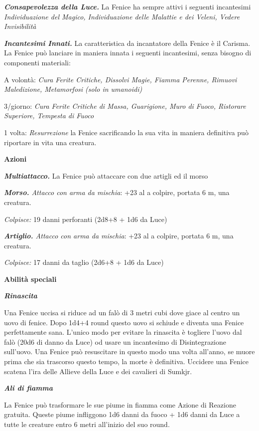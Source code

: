 \begin{multicols}{2}
\textit{\textbf{Consapevolezza della Luce.}} La Fenice ha sempre attivi i seguenti incantesimi \textit{Individuazione del Magico, Individuazione delle Malattie e dei Veleni, Vedere Invisibilità}

\textit{\textbf{Incantesimi Innati.}} La caratteristica da incantatore della Fenice è il Carisma. La Fenice può lanciare in maniera innata i seguenti incantesimi, senza bisogno di componenti materiali:

A volontà: \textit{Cura Ferite Critiche, Dissolvi Magie, Fiamma Perenne, Rimuovi Maledizione, Metamorfosi (solo in umanoidi)}

3/giorno: \textit{Cura Ferite Critiche di Massa, Guarigione, Muro di Fuoco, Ristorare Superiore, Tempesta di Fuoco}

1 volta: \textit{Resurrezione} la Fenice sacrificando la sua vita in maniera definitiva può riportare in vita una creatura.

\textbf{Azioni}

\textit{\textbf{Multiattacco.}} La Fenice può attaccare con due artigli ed il morso

\textit{\textbf{Morso.} Attacco con arma da mischia}: +23 al a colpire, portata 6 m, una creatura.

\textit{Colpisce:} 19 danni perforanti (2d8+8 + 1d6 da Luce)

\textit{\textbf{Artiglio.} Attacco con arma da mischia}: +23 al a colpire, portata 6 m, una creatura.

\textit{Colpisce:} 17 danni da taglio (2d6+8 + 1d6 da Luce)

\textbf{Abilità speciali}

\textit{\textbf{Rinascita}}

Una Fenice uccisa si riduce ad un falò di 3 metri cubi dove giace al centro un uovo di fenice. Dopo 1d4+4 round questo uovo si schiude e diventa una Fenice perfettamente sana. L'unico modo per evitare la rinascita è togliere l'uovo dal falò (20d6 di danno da Luce) od usare un incantesimo di Disintegrazione sull'uovo.
Una Fenice può resuscitare in questo modo una volta all’anno, se muore prima che sia trascorso questo tempo, la morte è definitiva. Uccidere una Fenice scatena l'ira delle Allieve della Luce e dei cavalieri di Sumkjr.

\textit{\textbf{Ali di fiamma}}

La Fenice può trasformare le sue piume in fiamma come Azione di Reazione gratuita. Queste piume infliggono 1d6 danni da fuoco + 1d6 danni da Luce a tutte le creature entro 6 metri all’inizio del suo round.


\end{multicols}
